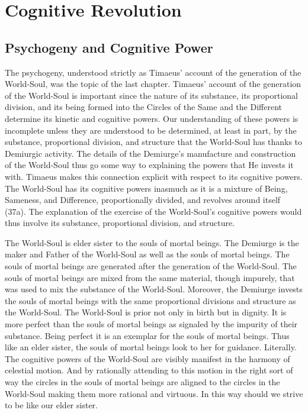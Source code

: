 
\chapter{Cognitive Revolution} %
\label{cha:cognitive_revolution}

\section{Psychogeny and Cognitive Power} %
\label{sec:psychogeny_and_psychic_power}

The psychogeny, understood strictly as Timaeus' account of the generation of the World-Soul, was the topic of the last chapter. Timaeus' account of the generation of the World-Soul is important since the nature of its substance, its proportional division, and its being formed into the Circles of the Same and the Different determine its kinetic and cognitive powers. Our understanding of these powers is incomplete unless they are understood to be determined, at least in part, by the substance, proportional division, and structure that the World-Soul has thanks to Demiurgic activity. The details of the Demiurge's manufacture and construction of the World-Soul thus go some way to explaining the powers that He invests it with. Timaeus makes this connection explicit with respect to its cognitive powers. The World-Soul has its cognitive powers inasmuch as it is a mixture of Being, Sameness, and Difference, proportionally divided, and revolves around itself (37a). The explanation of the exercise of the World-Soul's cognitive powers would thus involve its substance, proportional division, and structure.

The World-Soul is elder sister to the souls of mortal beings. The Demiurge is the maker and Father of the World-Soul as well as the souls of mortal beings. The souls of mortal beings are generated after the generation of the World-Soul. The souls of mortal beings are mixed from the same material, though impurely, that was used to mix the substance of the World-Soul. Moreover, the Demiurge invests the souls of mortal beings with the same proportional divisions and structure as the World-Soul. The World-Soul is prior not only in birth but in dignity. It is more perfect than the souls of mortal beings as signaled by the impurity of their substance. Being perfect it is an exemplar for the souls of mortal beings. Thus like an elder sister, the souls of mortal beings look to her for guidance. Literally. The cognitive powers of the World-Soul are visibly manifest in the harmony of celestial motion. And by rationally attending to this motion in the right sort of way the circles in the souls of mortal beings are aligned to the circles in the World-Soul making them more rational and virtuous. In this way should we strive to be like our elder sister.

